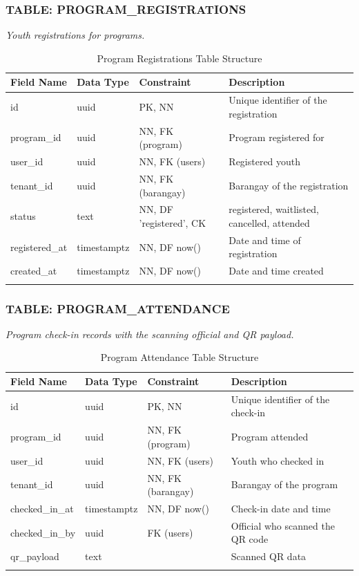 \subsubsection*{TABLE: PROGRAM\_REGISTRATIONS}
\noindent\textit{Youth registrations for programs.}
\begin{longtable}{|p{3.2cm}|p{2.2cm}|p{3.2cm}|p{5.4cm}|}
\hline
\textbf{Field Name} & \textbf{Data Type} & \textbf{Constraint} & \textbf{Description} \\ \hline
\endhead
\hline \endfoot
\hline \endlastfoot
id & uuid & PK, NN & Unique identifier of the registration \\ \hline
program\_id & uuid & NN, FK (program) & Program registered for \\ \hline
user\_id & uuid & NN, FK (users) & Registered youth \\ \hline
tenant\_id & uuid & NN, FK (barangay) & Barangay of the registration \\ \hline
status & text & NN, DF 'registered', CK & registered, waitlisted, cancelled, attended \\ \hline
registered\_at & timestamptz & NN, DF now() & Date and time of registration \\ \hline
created\_at & timestamptz & NN, DF now() & Date and time created \\ \hline
\caption{Program Registrations Table Structure}
\label{tab:program_registrations}
\end{longtable}
\vspace{3mm}

\subsubsection*{TABLE: PROGRAM\_ATTENDANCE}
\noindent\textit{Program check-in records with the scanning official and QR payload.}
\begin{longtable}{|p{3.2cm}|p{2.2cm}|p{3.2cm}|p{5.4cm}|}
\hline
\textbf{Field Name} & \textbf{Data Type} & \textbf{Constraint} & \textbf{Description} \\ \hline
\endhead
\hline \endfoot
\hline \endlastfoot
id & uuid & PK, NN & Unique identifier of the check-in \\ \hline
program\_id & uuid & NN, FK (program) & Program attended \\ \hline
user\_id & uuid & NN, FK (users) & Youth who checked in \\ \hline
tenant\_id & uuid & NN, FK (barangay) & Barangay of the program \\ \hline
checked\_in\_at & timestamptz & NN, DF now() & Check-in date and time \\ \hline
checked\_in\_by & uuid & FK (users) & Official who scanned the QR code \\ \hline
qr\_payload & text & & Scanned QR data \\ \hline
\caption{Program Attendance Table Structure}
\label{tab:program_attendance}
\end{longtable}
\vspace{3mm}

